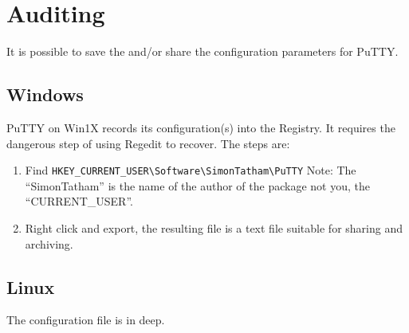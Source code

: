\section{Auditing}

It is possible to save the and/or share the configuration parameters
for PuTTY.

\subsection{Windows}

PuTTY on Win1X records its configuration(s) into the Registry. It
requires the dangerous step of using Regedit to recover. The steps are:

\vspace{-.15cm}
\begin{enumerate}\addtolength{\itemsep}{-0.5\baselineskip}
   \item   Find  \verb=HKEY_CURRENT_USER\Software\SimonTatham\PuTTY=
  Note: The ``SimonTatham'' is the name of the author of the package
  not you, the ``CURRENT\_USER''.
   \item   Right click and export, the resulting file is a text file suitable
  for sharing and archiving.
\end{enumerate}


\subsection{Linux}

The configuration file is in  deep.






